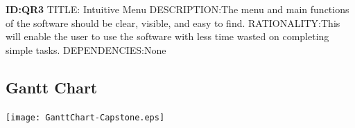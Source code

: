 \documentclass[onecolumn, draftclsnofoot,10pt, compsoc]{IEEEtran}
\begin{document}
\begin{singlespace}
    \textbf{ID:QR3}\newline
    TITLE: Intuitive Menu\newline
    DESCRIPTION:The menu and main functions of the software should be clear, visible, and easy to find.\newline
    RATIONALITY:This will enable the user to use the software with less time wasted on completing simple tasks.\newline
    DEPENDENCIES:None\newline

    
    

\subsection{Gantt Chart}
\texttt{[image: GanttChart-Capstone.eps]}
\end{singlespace}
\end{document}
